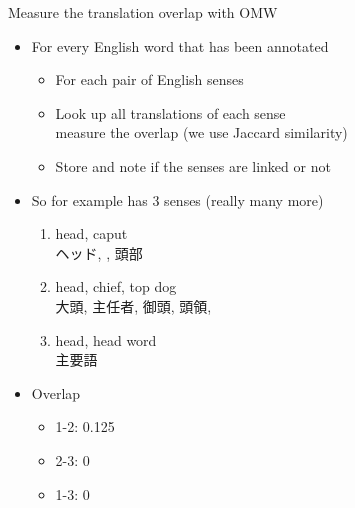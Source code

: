 \documentclass[xetex]{beamer}  %
\newcommand{\emp}[1]{\textbf{\color{blue}{#1}}}   %
\begin{document}
\begin{frame}{Measure the translation overlap with OMW}

  \begin{itemize}
  \item For every English word that has been annotated
    \begin{itemize}
    \item For each pair of English senses
    \item Look up all translations of each sense
      \\ measure the overlap (we use Jaccard similarity)
      \item Store and note if the senses are linked or not
    \end{itemize}
  \item So for example  has 3 senses (really many more)
    \begin{enumerate}
    \item head, caput
      \\ ヘッド, \emp{頭}, 頭部 
    \item head, chief, top dog
      \\ 大頭, 主任者, 御頭, 頭領, \emp{頭}
    \item head,  head word
      \\ 主要語
    \end{enumerate}
  \item Overlap
    \begin{itemize}
    \item 1-2: 0.125 %
    \item 2-3: 0
    \item 1-3: 0
    \end{itemize}
  \end{itemize}
  

\end{frame}
\end{document}

